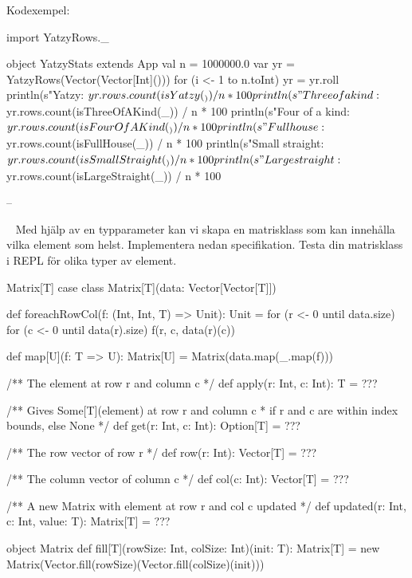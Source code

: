 Kodexempel:
\begin{CodeSmall}
import YatzyRows._

object YatzyStats extends App {
  val n = 1000000.0
  var yr = YatzyRows(Vector(Vector[Int]()))
  for (i <- 1 to n.toInt) yr = yr.roll
  println(s"Yatzy: ${yr.rows.count(isYatzy(_)) / n * 100}%
  println(s"Three of a kind: ${yr.rows.count(isThreeOfAKind(_)) / n * 100}%
  println(s"Four of a kind: ${yr.rows.count(isFourOfAKind(_)) / n * 100}%
  println(s"Full house: ${yr.rows.count(isFullHouse(_)) / n * 100}%
  println(s"Small straight: ${yr.rows.count(isSmallStraight(_)) / n * 100}%
  println(s"Large straight: ${yr.rows.count(isLargeStraight(_)) / n * 100}%
}
\end{CodeSmall}

\SubtaskSolved  --

\AdvancedTasks %


\QUESTEND







\QUESTBEGIN

\Task \label{task:generic-matrix} \what~   Med hjälp av en typparameter kan vi skapa en matrisklass som kan innehålla vilka element som helst. Implementera nedan specifikation. Testa din matrisklass i REPL för olika typer av element.

\begin{ScalaSpec}{Matrix[T]}
case class Matrix[T](data: Vector[Vector[T]]){

  def foreachRowCol(f: (Int, Int, T) => Unit): Unit =
    for (r <- 0 until data.size) {
      for (c <- 0 until data(r).size) {
        f(r, c, data(r)(c))
      }
    }

  def map[U](f: T => U): Matrix[U] = Matrix(data.map(_.map(f)))

  /** The element at row r and column c */
  def apply(r: Int, c: Int): T = ???

  /** Gives Some[T](element) at row r and column c
   *  if r and c are within index bounds, else None */
  def get(r: Int, c: Int): Option[T] = ???

  /** The row vector of row r */
  def row(r: Int): Vector[T] = ???

  /** The column vector of column c */
  def col(c: Int): Vector[T] = ???

  /** A new Matrix with element at row r and col c updated */
  def updated(r: Int, c: Int, value: T): Matrix[T] = ???
}
object Matrix {
  def fill[T](rowSize: Int, colSize: Int)(init: T): Matrix[T] =
    new Matrix(Vector.fill(rowSize)(Vector.fill(colSize)(init)))
}
\end{ScalaSpec}

